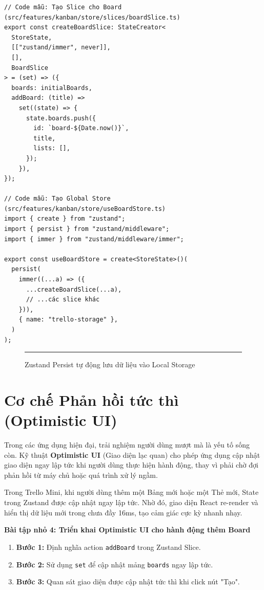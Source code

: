 \begin{Verbatim}
// Code mẫu: Tạo Slice cho Board (src/features/kanban/store/slices/boardSlice.ts)
export const createBoardSlice: StateCreator<
  StoreState,
  [["zustand/immer", never]],
  [],
  BoardSlice
> = (set) => ({
  boards: initialBoards,
  addBoard: (title) =>
    set((state) => {
      state.boards.push({
        id: `board-${Date.now()}`,
        title,
        lists: [],
      });
    }),
});

// Code mẫu: Tạo Global Store (src/features/kanban/store/useBoardStore.ts)
import { create } from "zustand";
import { persist } from "zustand/middleware";
import { immer } from "zustand/middleware/immer";

export const useBoardStore = create<StoreState>()(
  persist(
    immer((...a) => ({
      ...createBoardSlice(...a),
      // ...các slice khác
    })),
    { name: "trello-storage" },
  )
);
\end{Verbatim}

\begin{figure}[H]
    \centering
    \rule{0.8\textwidth}{0.4\textwidth}
    \caption{Zustand Persist tự động lưu dữ liệu vào Local Storage}
\end{figure}

\section{Cơ chế Phản hồi tức thì (Optimistic UI)}
Trong các ứng dụng hiện đại, trải nghiệm người dùng mượt mà là yếu tố sống còn. Kỹ thuật \textbf{Optimistic UI} (Giao diện lạc quan) cho phép ứng dụng cập nhật giao diện ngay lập tức khi người dùng thực hiện hành động, thay vì phải chờ đợi phản hồi từ máy chủ hoặc quá trình xử lý ngầm.

Trong Trello Mini, khi người dùng thêm một Bảng mới hoặc một Thẻ mới, State trong Zustand được cập nhật ngay lập tức. Nhờ đó, giao diện React re-render và hiển thị dữ liệu mới trong chưa đầy 16ms, tạo cảm giác cực kỳ nhanh nhạy.

\textbf{Bài tập nhỏ 4: Triển khai Optimistic UI cho hành động thêm Board}
\begin{enumerate}
    \item \textbf{Bước 1:} Định nghĩa action \texttt{addBoard} trong Zustand Slice.
    \item \textbf{Bước 2:} Sử dụng \texttt{set} để cập nhật mảng \texttt{boards} ngay lập tức.
    \item \textbf{Bước 3:} Quan sát giao diện được cập nhật tức thì khi click nút "Tạo".
\end{enumerate}

